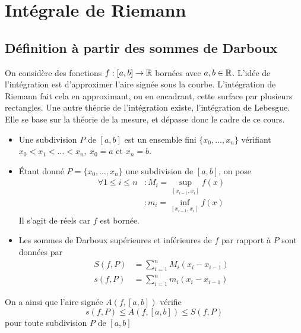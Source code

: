 \chapter{Intégrale de Riemann}
\section{Définition à partir des sommes de Darboux}
On considère des fonctions $f:[a,b]\to \mathbb{R}$ bornées avec $a,b\in\mathbb{R}$. L'idée de l'intégration est d'approximer l'aire signée sous la courbe. L'intégration de Riemann fait cela en approximant, ou en encadrant, cette surface par plusieurs rectangles. Une autre théorie de l'intégration existe, l'intégration de Lebesgue. Elle se base sur la théorie de la mesure, et dépasse donc le cadre de ce cours.
\begin{definition}
\begin{itemize}
    \item Une subdivision $P$ de $[a,b]$ est un ensemble fini $\{x_0,\dotsc, x_n\}$ vérifiant $x_0<x_1<\dots<x_n,\ x_0 = a$ et $x_n = b$.
    \item Étant donné $P=\{x_0,\dotsc,x_n\}$ une subdivision de $[a,b]$, on pose \begin{align*}
        \forall 1\le i \le n &: M_i = \sup_{[x_{i-1},x_i]}f(x)\\
        &: m_i = \inf_{[x_{i-1},x_i]}f(x)
    \end{align*} Il s'agit de réels car $f$ est bornée.
    \item Les sommes de Darboux supérieures et inférieures de $f$ par rapport à $P$ sont données par 
    \begin{align*}
        S(f,P) &= \sum_{i=1}^nM_i(x_i-x_{i-1})\\
        s(f,P) &= \sum_{i=1}^nm_i(x_i-x_{i-1})
    \end{align*}
\end{itemize}
\end{definition}
\begin{remarque}
    On a ainsi que l'aire signée $A(f,[a,b])$ vérifie $$s(f,P)\le A(f,[a,b])\le S(f,P)$$
pour toute subdivision $P$ de $[a,b]$
\end{remarque}




